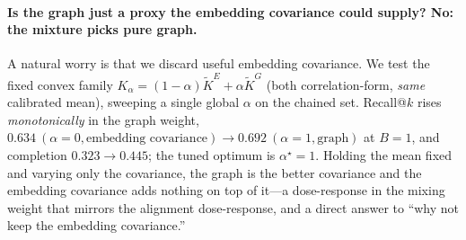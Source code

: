 \documentclass[11pt]{article}
\theoremstyle{plain}\newtheorem{theorem}{Theorem}\newtheorem{lemma}{Lemma}\newtheorem{proposition}{Proposition}
\theoremstyle{definition}\newtheorem{assumption}{Assumption}\newtheorem{remark}{Remark}
\begin{document}
\paragraph{Is the graph just a proxy the embedding covariance could supply? No: the mixture picks pure graph.}
A natural worry is that we discard useful embedding covariance. We test the fixed convex family
$K_\alpha=(1-\alpha)\widetilde K^E+\alpha\widetilde K^G$ (both correlation-form, \emph{same} calibrated mean),
sweeping a single global $\alpha$ on the chained set. Recall@$k$ rises \emph{monotonically} in the graph weight,
$0.634\ (\alpha{=}0,\text{embedding covariance})\to0.692\ (\alpha{=}1,\text{graph})$ at $B{=}1$, and completion
$0.323\to0.445$; the tuned optimum is $\alpha^\star=1$. Holding the mean fixed and varying only the covariance, the
graph is the better covariance and the embedding covariance adds nothing on top of it---a dose-response in the
mixing weight that mirrors the alignment dose-response, and a direct answer to ``why not keep the embedding
covariance.''
\end{document}

